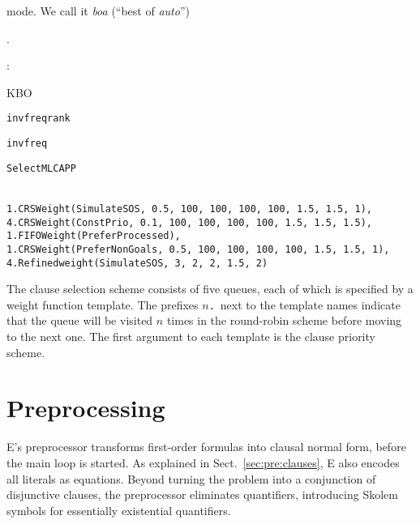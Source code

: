 mode. We call it \emph{boa} (``best of \emph{auto}'')\begin{conf}.\end{conf}\begin{rep}:
%
\begin{description}[labelwidth=\widthof{Precedence generation:}]
  \item[\rm Term order:] KBO
  \item[\rm Weight generation:] \texttt{invfreqrank}
  \item[\rm Precedence generation:] \texttt{invfreq}
  \item[\rm Literal selection:] \texttt{SelectMLCAPP}
  \item[\rm Clause selection:] ~ \\
\verb|1.CRSWeight(SimulateSOS, 0.5, 100, 100, 100, 100, 1.5, 1.5, 1),| \\
\verb|4.CRSWeight(ConstPrio, 0.1, 100, 100, 100, 100, 1.5, 1.5, 1.5),| \\
\verb|1.FIFOWeight(PreferProcessed),| \\
\verb|1.CRSWeight(PreferNonGoals, 0.5, 100, 100, 100, 100, 1.5, 1.5, 1),| \\
\verb|4.Refinedweight(SimulateSOS, 3, 2, 2, 1.5, 2)|
\end{description}
%
The clause selection scheme consists of five queues, each of which is
specified by a weight function template. The prefixes $n$\texttt{.}\ next to
the template names indicate that the queue will be visited $n$ times in the round-robin scheme
before moving to the next one. The first argument to each
template is the clause priority scheme.




  

\section{Preprocessing}
\label{sec:ehoh:preprocessing}

E's preprocessor transforms first-order formulas into clausal
normal form, before the main loop is started. %
As explained in Sect.~\ref{sec:pre:clauses}, E also encodes all literals
as equations.
Beyond turning the problem into a
conjunction of disjunctive clauses, the preprocessor eliminates quantifiers,
introducing Skolem symbols for essentially existential quantifiers.


\end{rep}
